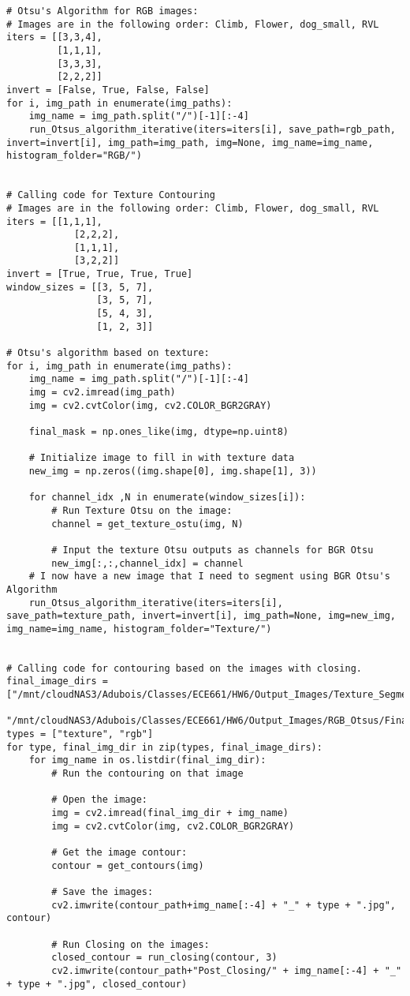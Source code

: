 \documentclass{article}
\begin{document}
\begin{lstlisting}
# Otsu's Algorithm for RGB images:
# Images are in the following order: Climb, Flower, dog_small, RVL
iters = [[3,3,4], 
         [1,1,1],
         [3,3,3],
         [2,2,2]]
invert = [False, True, False, False]
for i, img_path in enumerate(img_paths):
    img_name = img_path.split("/")[-1][:-4]
    run_Otsus_algorithm_iterative(iters=iters[i], save_path=rgb_path, invert=invert[i], img_path=img_path, img=None, img_name=img_name, histogram_folder="RGB/")    
    

# Calling code for Texture Contouring
# Images are in the following order: Climb, Flower, dog_small, RVL
iters = [[1,1,1],
            [2,2,2],
            [1,1,1],
            [3,2,2]]
invert = [True, True, True, True]
window_sizes = [[3, 5, 7],
                [3, 5, 7],
                [5, 4, 3],
                [1, 2, 3]]

# Otsu's algorithm based on texture:
for i, img_path in enumerate(img_paths):
    img_name = img_path.split("/")[-1][:-4]
    img = cv2.imread(img_path)
    img = cv2.cvtColor(img, cv2.COLOR_BGR2GRAY)
    
    final_mask = np.ones_like(img, dtype=np.uint8)
    
    # Initialize image to fill in with texture data
    new_img = np.zeros((img.shape[0], img.shape[1], 3))
    
    for channel_idx ,N in enumerate(window_sizes[i]):
        # Run Texture Otsu on the image:
        channel = get_texture_ostu(img, N)

        # Input the texture Otsu outputs as channels for BGR Otsu
        new_img[:,:,channel_idx] = channel
    # I now have a new image that I need to segment using BGR Otsu's Algorithm
    run_Otsus_algorithm_iterative(iters=iters[i], save_path=texture_path, invert=invert[i], img_path=None, img=new_img, img_name=img_name, histogram_folder="Texture/")    


# Calling code for contouring based on the images with closing.
final_image_dirs = ["/mnt/cloudNAS3/Adubois/Classes/ECE661/HW6/Output_Images/Texture_Segmentation/Final_Images/",
                   "/mnt/cloudNAS3/Adubois/Classes/ECE661/HW6/Output_Images/RGB_Otsus/Final_Images/"]
types = ["texture", "rgb"]
for type, final_img_dir in zip(types, final_image_dirs):
    for img_name in os.listdir(final_img_dir):
        # Run the contouring on that image
        
        # Open the image:
        img = cv2.imread(final_img_dir + img_name)
        img = cv2.cvtColor(img, cv2.COLOR_BGR2GRAY)
        
        # Get the image contour:
        contour = get_contours(img)
        
        # Save the images:
        cv2.imwrite(contour_path+img_name[:-4] + "_" + type + ".jpg", contour)
        
        # Run Closing on the images:
        closed_contour = run_closing(contour, 3)
        cv2.imwrite(contour_path+"Post_Closing/" + img_name[:-4] + "_" + type + ".jpg", closed_contour)


\end{lstlisting}
\end{document}
